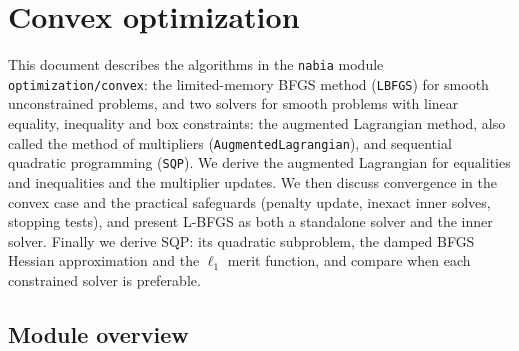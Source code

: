 \chapter{Convex optimization}\label{ch:co}

This document describes the algorithms in the \texttt{nabia} module
\texttt{optimization/convex}: the limited-memory BFGS method (\texttt{LBFGS})
for smooth unconstrained problems, and two solvers for smooth problems with
linear equality, inequality and box constraints: the augmented Lagrangian
method, also called the method of multipliers (\texttt{AugmentedLagrangian}),
and sequential quadratic programming (\texttt{SQP}). We derive the
augmented Lagrangian for equalities and inequalities and the multiplier updates. We then
discuss convergence in the convex case and the practical safeguards (penalty update,
inexact inner solves, stopping tests), and present L-BFGS as both a standalone
solver and the inner solver. Finally we derive SQP: its quadratic subproblem,
the damped BFGS Hessian approximation and the $\ell_1$ merit function, and
compare when each constrained solver is preferable.




\section{Module overview}


